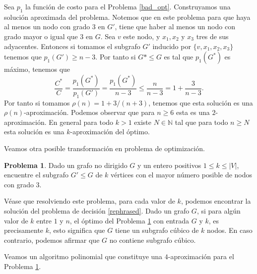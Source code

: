 \documentclass[10pt]{amsart}
\theoremstyle{definition}
\newtheorem{prob}[theorem]{Problema}
\numberwithin{equation}{section}
\newcommand{\nn}{\mathbb{N}}
\begin{document}
	Sea $p_1$ la funci\'on de costo para el Problema \ref{bad_opt}. Construyamos una soluci\'on aproximada del problema. Notemos que en este problema para que haya al menos un nodo con grado $3$ en $G'$, tiene que haber al menos un nodo con grado mayor o igual que $3$ en $G$.  Sea $v$ este nodo, y $x_1, x_2$ y $x_3$ tres de sus adyacentes. Entonces si tomamos el subgrafo $G'$ inducido por $\{v, x_1, x_2, x_3\}$ tenemos que $p_1(G') \ge n - 3$. Por tanto si $G* \le G$ es tal que $p_1(G^*)$ es m\'aximo, tenemos que 
	\[
	\frac{C^*}{C} = \frac{p_1(G^*)}{p_1(G')} = \frac{p_1(G^*)}{n - 3} \le \frac{n}{n-3} = 1 + \frac{3}{n - 3}.
	\]
	Por tanto si tomamos $\rho(n) = 1 + 3/(n + 3)$, tenemos que esta soluci\'on es una $\rho(n)$-aproximaci\'on. Podemos observar que para $n \ge 6$ esta es una $2$-aproximaci\'on. En general para todo $k > 1$ existe $N \in \nn$ tal que para todo $n \ge N$ esta soluci\'on es una $k$-aproximaci\'on del \'optimo.
	
	Veamos otra posible transformaci\'on en problema de optimizaci\'on. 
	
	\begin{prob} \label{best_appx}
		Dado un grafo no dirigido $G$ y un entero positivos $1 \le k \le |V|$, encuentre el subgrafo $G' \le G$ de $k$ v\'ertices con el mayor n\'umero posible de nodos con grado $3$.
	\end{prob}

	V\'ease que resolviendo este problema, para cada valor de $k$, podemos encontrar la soluci\'on del problema de decisi\'on \ref{rephrased}. Dado un grafo $G$, si para alg\'un valor de $k$ entre $1$ y $n$, el \'optimo del Problema \ref{best_appx} con entrada $G$ y $k$, es precisamente $k$, esto significa que $G$ tiene un subgrafo c\'ubico de $k$ nodos. En caso contrario, podemos afirmar que $G$ no contiene subgrafo c\'ubico.
	
	Veamos  un algoritmo polinomial que constituye una $4$-aproximaci\'on para el Problema \ref{best_appx}.
	
\end{document}
